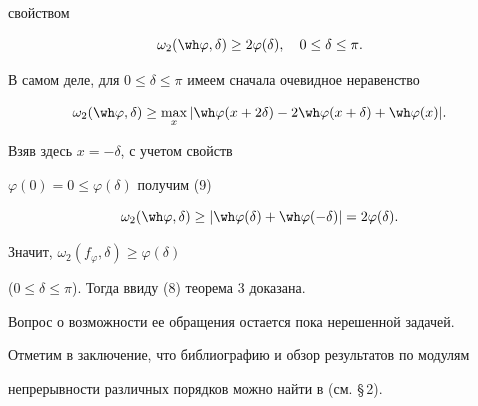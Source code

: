 свойством 


\begin{equation} 


\omega_2(\wh\varphi,\delta)\ge 2\varphi(\delta),\quad 


0\le\delta\le\pi. 


\end{equation} 


В самом деле, для $0\le\delta\le\pi$ имеем сначала очевидное неравенство 


$$ 


\omega_2(\wh\varphi,\delta)\ge\max_x|\wh\varphi(x+2\delta)- 


2\wh\varphi(x+\delta)+\wh\varphi(x)|. 


$$ 


Взяв здесь $x=-\delta$, с учетом свойств 


$\varphi(0)=0\le\varphi(\delta)$ получим (9) 


$$ 


\omega_2(\wh\varphi,\delta)\ge|\wh\varphi(\delta)+ 


\wh\varphi(-\delta)|=2\varphi(\delta). 


$$ 


Значит, $\omega_2(f_\varphi,\delta)\ge\varphi(\delta)$ 


($0\le\delta\le\pi$). Тогда ввиду (8) теорема 3 доказана. 


Вопрос о возможности ее обращения остается пока нерешенной задачей. 


 


Отметим в заключение, что библиографию и обзор результатов по модулям 


непрерывности различных порядков можно найти в \cite{4} (см. \S\,2). 


 



